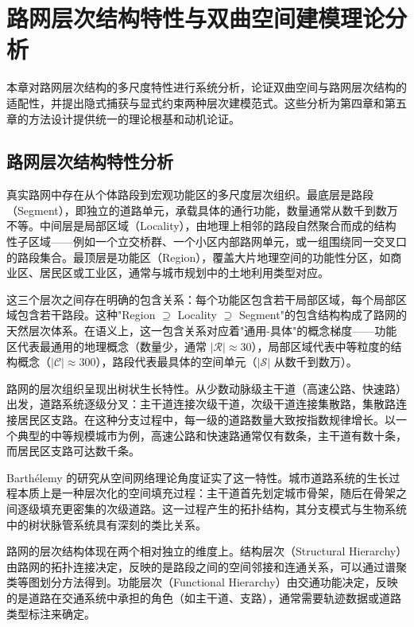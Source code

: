 \chapter{路网层次结构特性与双曲空间建模理论分析}

本章对路网层次结构的多尺度特性进行系统分析，论证双曲空间与路网层次结构的适配性，并提出隐式捕获与显式约束两种层次建模范式。这些分析为第四章和第五章的方法设计提供统一的理论根基和动机论证。

\section{路网层次结构特性分析}

真实路网中存在从个体路段到宏观功能区的多尺度层次组织。最底层是路段（Segment），即独立的道路单元，承载具体的通行功能，数量通常从数千到数万不等。中间层是局部区域（Locality），由地理上相邻的路段自然聚合而成的结构性子区域——例如一个立交桥群、一个小区内部路网单元，或一组围绕同一交叉口的路段集合。最顶层是功能区（Region），覆盖大片地理空间的功能性分区，如商业区、居民区或工业区，通常与城市规划中的土地利用类型对应。

这三个层次之间存在明确的包含关系：每个功能区包含若干局部区域，每个局部区域包含若干路段。这种"Region $\supseteq$ Locality $\supseteq$ Segment"的包含结构构成了路网的天然层次体系。在语义上，这一包含关系对应着"通用-具体"的概念梯度——功能区代表最通用的地理概念（数量少，通常 $|\mathcal{R}| \approx 30$），局部区域代表中等粒度的结构概念（$|\mathcal{C}| \approx 300$），路段代表最具体的空间单元（$|\mathcal{S}|$ 从数千到数万）。

路网的层次组织呈现出树状生长特性。从少数动脉级主干道（高速公路、快速路）出发，道路系统逐级分叉：主干道连接次级干道，次级干道连接集散路，集散路连接居民区支路。在这种分支过程中，每一级的道路数量大致按指数规律增长。以一个典型的中等规模城市为例，高速公路和快速路通常仅有数条，主干道有数十条，而居民区支路可达数千条。

Barth\'{e}lemy\cite{Barthelemy2011} 的研究从空间网络理论角度证实了这一特性。城市道路系统的生长过程本质上是一种层次化的空间填充过程：主干道首先划定城市骨架，随后在骨架之间逐级填充更密集的次级道路。这一过程产生的拓扑结构，其分支模式与生物系统中的树状脉管系统具有深刻的类比关系。

路网的层次结构体现在两个相对独立的维度上。结构层次（Structural Hierarchy）由路网的拓扑连接决定，反映的是路段之间的空间邻接和连通关系，可以通过谱聚类等图划分方法得到。功能层次（Functional Hierarchy）由交通功能决定，反映的是道路在交通系统中承担的角色（如主干道、支路），通常需要轨迹数据或道路类型标注来确定。

